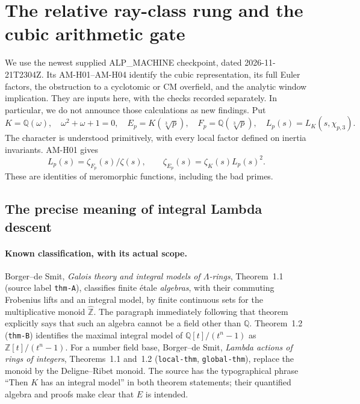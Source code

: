\section{The relative ray-class rung and the cubic arithmetic gate}
\label{sec:kummer-lambda}

We use the newest supplied ALP\_MACHINE checkpoint, dated
2026-11-21T2304Z. Its AM-H01--AM-H04 identify the cubic representation,
its full Euler factors, the obstruction to a cyclotomic or CM overfield,
and the analytic window implication. They are inputs here, with the
checks recorded separately. In particular, we do not announce those
calculations as new findings. Put
\[
 K=\mathbb Q(\omega),\quad \omega^2+\omega+1=0,
 \quad E_p=K(\sqrt[3]p),\quad F_p=\mathbb Q(\sqrt[3]p),
 \quad L_p(s)=L_K(s,\chi_{p,3}).
\]
The character is understood primitively, with every local factor
defined on inertia invariants. AM-H01 gives
\begin{equation}
 L_p(s)=\zeta_{F_p}(s)/\zeta(s),\qquad
 \zeta_{E_p}(s)=\zeta_K(s)L_p(s)^2.                 \label{eq:kummer-zeta}
\end{equation}
These are identities of meromorphic functions, including the bad primes.

\subsection{The precise meaning of integral Lambda descent}

\paragraph{Known classification, with its actual scope.}
Borger--de Smit, \emph{Galois theory and integral models of
$\Lambda$-rings}, Theorem~1.1 (source label \texttt{thm-A}),
classifies finite \'etale \emph{algebras}, with their commuting
Frobenius lifts and an integral model, by finite continuous sets
for the multiplicative monoid $\widehat{\mathbb Z}$.
The paragraph immediately following that theorem explicitly says
that such an algebra cannot be a field other than $\mathbb Q$.
Theorem~1.2 (\texttt{thm-B}) identifies the maximal integral model
of $\mathbb Q[t]/(t^n-1)$ as $\mathbb Z[t]/(t^n-1)$.
For a number field base, Borger--de Smit, \emph{Lambda actions of
rings of integers}, Theorems~1.1 and~1.2 (\texttt{local-thm},
\texttt{global-thm}), replace the monoid by the Deligne--Ribet
monoid. The source has the typographical phrase ``Then $K$ has an
integral model'' in both theorem statements; their quantified
algebra and proofs make clear that $E$ is intended.

